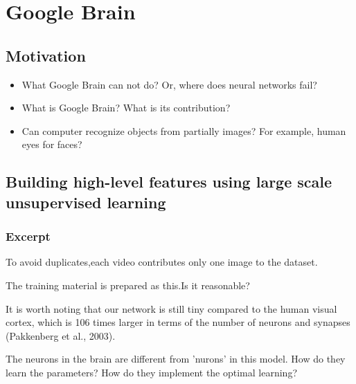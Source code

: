 \chapter{Google Brain}

\section{Motivation}
	\begin{itemize}
		\item What Google Brain can not do? Or, where does neural networks fail?
		\item What is Google Brain? What is its contribution?
		\item Can computer recognize objects from partially images? For example, human eyes for faces?
	\end{itemize}

\section{Building high-level features using large scale unsupervised learning}

\subsection{Excerpt}

\begin{itquote}
To avoid duplicates,each video contributes only one image to the dataset.
\end{itquote}
The training material is prepared as this.Is it reasonable?\\

\begin{itquote}
 It is worth noting that our network is still tiny compared
to the human visual cortex, which is 106
times larger in terms of the number of neurons and
synapses (Pakkenberg et al., 2003).
\end{itquote}
The neurons in the brain are different from 'nurons' in this model. How do they learn the parameters? How do they implement the optimal learning? 